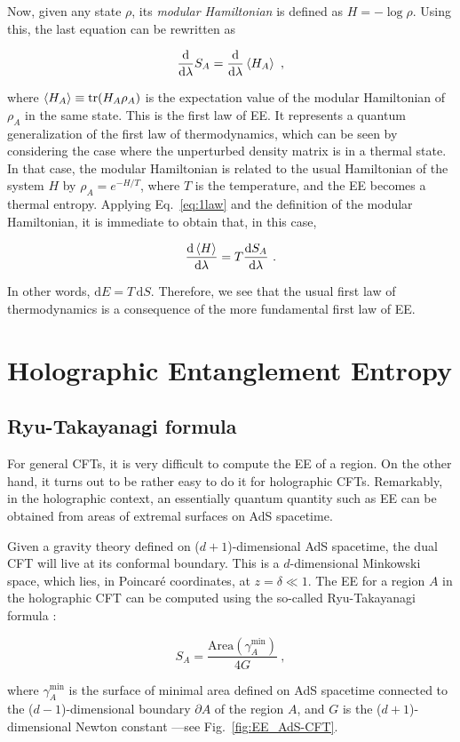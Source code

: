 \documentclass[twocolumn]{revtex4}
\providecommand{\eq}[2]{
    \begin{equation}
        #2
    \label{eq:#1}
    \end{equation}
}
\DeclareMathOperator{\tr}{tr}
\begin{document}
Now, given any state $\rho$, its \emph{modular Hamiltonian} is defined as $H = - \log \rho$. %
Using this, the last equation can be rewritten  as
\eq{1law}{
    \frac{\mathrm{d}}{\mathrm{d} \lambda} S_A = \frac{\mathrm{d}}{\mathrm{d} \lambda} \braket{H_A} \ ,
}
where $\braket{H_A} \equiv \tr (H_A \rho_A)$ is the expectation value of the modular Hamiltonian of $\rho_A$ in the same state. This is the first law of EE. It %
represents a quantum generalization of the first law of thermodynamics, which can be seen by considering the case where the unperturbed density matrix is in a  thermal state. In that case, the modular Hamiltonian is related to the usual Hamiltonian of the system $H$ by
$
    \rho_A =  e^{-H/T} 
$, where $T$ is the temperature,
and the EE becomes a thermal entropy. Applying Eq.~\ref{eq:1law} and the definition of the modular Hamiltonian, it is immediate to obtain that, in this case,
\eq{1law_thermo}{
    \frac{\mathrm{d}\braket{H}}{\mathrm{d} \lambda}  =  T \frac{\mathrm{d}S_A}{\mathrm{d} \lambda}  \ .
}
In other words, $\mathrm{d} E = T \, \mathrm{d} S$. Therefore, we see that the usual first law of thermodynamics is a consequence of  the more fundamental first law of EE.


\section{Holographic Entanglement Entropy} \label{s:EE_Holo}


\subsection{Ryu-Takayanagi formula} \label{ss:R-T}

For general CFTs, it is very difficult to compute the EE of a region. On the other hand, it turns out to be rather easy to do it for holographic CFTs. Remarkably, in the holographic context, an essentially quantum quantity such as EE can be obtained from areas of extremal surfaces on AdS spacetime.

Given a gravity theory defined on ($d+1$)-dimensional AdS spacetime, the dual CFT will live at its conformal boundary. This is a $d$-dimensional Minkowski space, which lies, in Poincar\'e coordinates, at 
$z=\delta \ll 1$. The EE for a region $A$ in the holographic CFT can be computed using the so-called Ryu-Takayanagi formula \cite{ryu_holographic_2008}:
\eq{EE_RT}{
    S_A = \frac{ \text{Area}(\gamma_A^\text{min}) }{ 4 G } \ ,
}
where $\gamma_A^\text{min}$ is the surface of minimal area defined on AdS spacetime connected to the ($d-1$)-dimensional boundary $\partial A$ of the region $A$, and $G$ is the ($d+1$)-dimensional Newton constant ---see Fig.~\ref{fig:EE_AdS-CFT}.
\end{document}
